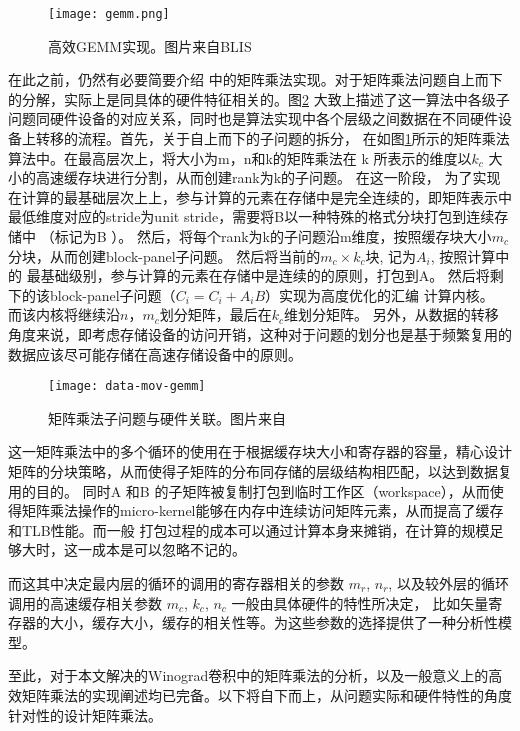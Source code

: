 \begin{figure}
\centering
\texttt{[image: gemm.png]}
\caption{高效GEMM实现。图片来自BLIS\protect\cite{Low2016AnalyticalMI}}
\label{fig:gemm}
\end{figure}

在此之前，仍然有必要简要介绍\cite{BLIS1} 中的矩阵乘法实现。对于矩阵乘法问题自上而下的分解，实际上是同具体的硬件特征相关的。图\ref{fig:gemm-hw} 大致上描述了这一算法中各级子问题同硬件设备的对应关系，同时也是算法实现中各个层级之间数据在不同硬件设备上转移的流程。首先，关于自上而下的子问题的拆分，
在如图\ref{fig:gemm}所示的矩阵乘法算法中。在最高层次上，将大小为m，n和k的矩阵乘法在 k 所表示的维度以$k_c$ 大小的高速缓存块进行分割，从而创建rank为k的子问题。 在这一阶段，
为了实现在计算的最基础层次上上，参与计算的元素在存储中是完全连续的，即矩阵表示中最低维度对应的stride为unit stride，需要将B以一种特殊的格式分块打包到连续存储中
（标记为B ）。 然后，将每个rank为k的子问题沿m维度，按照缓存块大小$m_c$分块，从而创建block-panel子问题。 然后将当前的$m_c×k_c$块, 记为$A_i$, 按照计算中的
最基础级别，参与计算的元素在存储中是连续的的原则，打包到A。 然后将剩下的该block-panel子问题（$C_i = C_i + A_i B$）实现为高度优化的汇编
计算内核。 而该内核将继续沿$n$，$m_c$划分矩阵，最后在$k_c$维划分矩阵。
另外，从数据的转移角度来说，即考虑存储设备的访问开销，这种对于问题的划分也是基于频繁复用的数据应该尽可能存储在高速存储设备中的原则。

\begin{figure}
  \centering
  \texttt{[image: data-mov-gemm]}
  \caption{矩阵乘法子问题与硬件关联。图片来自\protect\cite{Low2016AnalyticalMI}}
  \label{fig:gemm-hw}
\end{figure}

这一矩阵乘法中的多个循环的使用在于根据缓存块大小和寄存器的容量，精心设计矩阵的分块策略，从而使得子矩阵的分布同存储的层级结构相匹配，以达到数据复用的目的。
同时A 和B 的子矩阵被复制打包到临时工作区（workspace），从而使得矩阵乘法操作的micro-kernel能够在内存中连续访问矩阵元素，从而提高了缓存和TLB性能。而一般
打包过程的成本可以通过计算本身来摊销，在计算的规模足够大时，这一成本是可以忽略不记的。

而这其中决定最内层的循环的调用的寄存器相关的参数 $m_r$, $n_r$, 以及较外层的循环调用的高速缓存相关参数 $m_c$, $k_c$, $n_c$ 一般由具体硬件的特性所决定，
比如矢量寄存器的大小，缓存大小，缓存的相关性等。\cite{Low2016AnalyticalMI}为这些参数的选择提供了一种分析性模型。


至此，对于本文解决的Winograd卷积中的矩阵乘法的分析，以及一般意义上的高效矩阵乘法的实现阐述均已完备。以下将自下而上，从问题实际和硬件特性的角度针对性的设计矩阵乘法。

